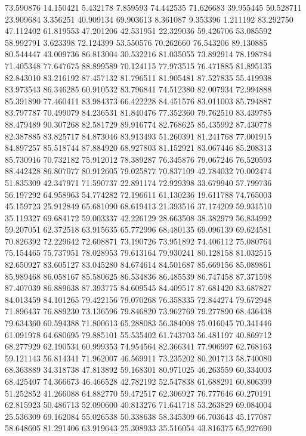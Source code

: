 73.590876
14.150421
5.432178
7.859593
74.442535
71.626683
39.955445
50.528711
23.909684
3.356251
40.909134
69.903613
8.361087
9.353396
1.211192
83.292750
47.112402
61.819553
47.201206
42.531951
22.329036
59.426706
53.085592
58.992791
3.623398
72.124399
53.550576
70.262660
76.543206
89.130885
80.544447
43.009736
86.813004
30.532216
81.035055
73.892914
78.198784
71.405348
77.647675
88.899589
70.124115
77.973515
76.471885
81.895135
82.843010
83.216192
87.457132
81.796511
81.905481
87.527835
55.419938
83.973543
86.346285
60.910532
83.796841
74.512380
82.007934
72.994888
85.391890
77.460411
83.984373
66.422228
84.451576
83.011003
85.794887
83.797787
70.499079
84.236531
81.840476
77.352360
79.762510
83.439785
88.479489
90.307268
82.581729
89.916774
82.768625
85.435992
87.430778
82.387885
83.825717
84.873046
83.913493
51.260391
81.241768
77.001915
84.897257
85.518744
87.884920
68.927803
81.152921
83.067446
85.208313
85.730916
70.732182
75.912012
78.389287
76.345876
79.067246
76.520593
88.442428
86.807077
80.912605
79.025877
70.837109
42.784032
70.002474
51.835309
42.347971
71.590737
22.891174
72.929398
33.679940
57.799736
56.197292
64.958963
54.774282
72.196611
61.130236
19.611788
74.765003
45.159723
25.912849
65.681090
68.619413
21.393516
37.174209
59.931510
35.119327
69.684172
59.003337
42.226129
28.663508
38.382979
56.834992
59.207051
62.372518
63.915635
65.772996
68.480135
69.096139
69.624581
70.826392
72.229642
72.608871
73.190726
73.951892
74.406112
75.080764
75.154465
75.737951
78.028953
79.613164
79.930241
80.128158
81.032515
82.650927
83.605127
83.045280
84.674614
84.501687
85.669156
85.089861
85.989468
86.058167
85.580625
86.534836
86.485539
86.747458
87.371598
87.407039
86.889638
87.393775
84.609545
84.409517
87.681420
83.687827
84.013459
84.101265
79.422156
79.070268
76.358335
72.844274
79.672948
71.896437
76.889230
73.136596
79.846820
73.962769
79.277890
68.436438
79.634360
60.594388
71.800613
65.288083
56.384008
75.016045
70.341446
61.091978
64.680695
79.885101
55.535402
61.743703
56.481197
40.869712
68.277929
62.190534
60.999353
74.954564
82.366341
77.906997
62.768163
59.121143
56.814341
71.962007
46.569911
73.235202
80.201713
58.740080
68.363889
34.318738
47.813892
59.168301
80.971025
46.263559
60.334003
68.425407
74.366673
46.466528
42.782192
52.547838
61.688291
60.806399
51.252852
41.266088
64.882770
59.472517
62.306927
76.777646
60.270191
62.815923
50.486713
52.090600
40.813276
71.641718
53.263829
69.084004
25.536309
69.162084
55.026538
50.338638
58.345309
66.703643
45.177087
58.648605
81.291406
63.919643
25.308933
35.516054
43.816375
65.927690
